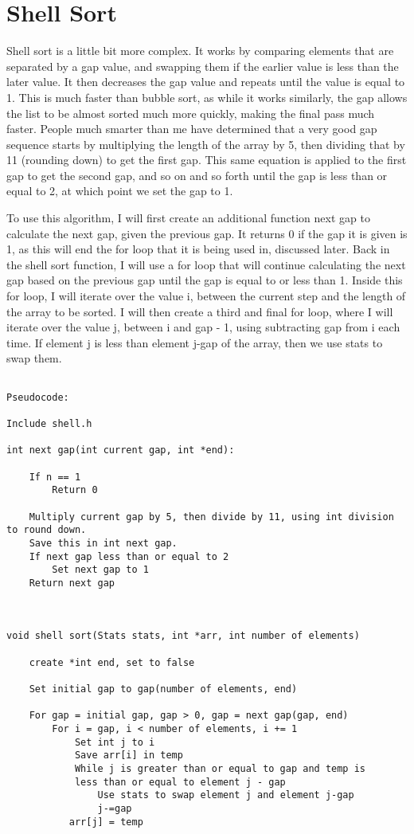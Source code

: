 \documentclass[11pt]{article}
\begin{document}
\section{Shell Sort}

Shell sort is a little bit more complex. It works by comparing elements that are separated by a gap value, and swapping them if the earlier value is less than the later value. It then decreases the gap value and repeats until the value is equal to 1. This is much faster than bubble sort, as while it works similarly, the gap allows the list to be almost sorted much more quickly, making the final pass much faster. People much smarter than me have determined that a very good gap sequence starts by multiplying the length of the array by 5, then dividing that by 11 (rounding down) to get the first gap. This same equation is applied to the first gap to get the second gap, and so on and so forth until the gap is less than or equal to 2, at which point we set the gap to 1.

To use this algorithm, I will first create an additional function next gap to calculate the next gap, given the previous gap. It returns 0 if the gap it is given is 1, as this will end the for loop that it is being used in, discussed later. Back in the shell sort function, I will use a for loop that will continue calculating the next gap based on the previous gap until the gap is equal to or less than 1. Inside this for loop, I will iterate over the value i, between the current step and the length of the array to be sorted. I will then create a third and final for loop, where I will iterate over the value j, between i and gap - 1, using subtracting gap from i each time. If element j is less than element j-gap of the array, then we use stats to swap them.

\begin{verbatim}

Pseudocode:

Include shell.h

int next gap(int current gap, int *end):

    If n == 1
        Return 0

    Multiply current gap by 5, then divide by 11, using int division to round down.
    Save this in int next gap.
    If next gap less than or equal to 2
        Set next gap to 1
    Return next gap



void shell sort(Stats stats, int *arr, int number of elements)

    create *int end, set to false

    Set initial gap to gap(number of elements, end)

    For gap = initial gap, gap > 0, gap = next gap(gap, end)
        For i = gap, i < number of elements, i += 1
            Set int j to i
            Save arr[i] in temp
            While j is greater than or equal to gap and temp is 
            less than or equal to element j - gap
                Use stats to swap element j and element j-gap
                j-=gap
           arr[j] = temp

\end{verbatim}
\end{document}
